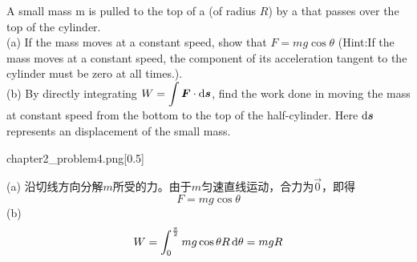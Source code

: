 \begin{solution}[质点动力学计算]
    A small mass m is pulled to the top of a   (of radius $R$) by a  that passes over the top of the cylinder.\\
    (a) If the mass moves at a constant speed, show that $F=mg\cos\theta$ (Hint:If the mass moves at a constant speed, the component of its acceleration tangent to the cylinder must be zero at all times.).\\
    (b) By directly integrating $\displaystyle W=\int \vec{F}\cdot \dif \vec{s}$, find the work done in moving the mass at constant speed from the bottom to the top of the half-cylinder. Here $\dif \vec{s}$ represents an  displacement of the small mass.

    \begin{singlefigure}[第五题图]{chapter2_problem4.png}[0.5]
    \end{singlefigure}

    \tcbrule

    (a) 沿切线方向分解$m$所受的力。由于$m$匀速直线运动，合力为$\vec{0}$，即得
    \[
        F=mg\cos\theta
    \]
    (b)
    \[
        W=\int_{0}^{\frac{\pi}{2}}mg\cos\theta R\dif \theta=mgR
    \]
\end{solution}